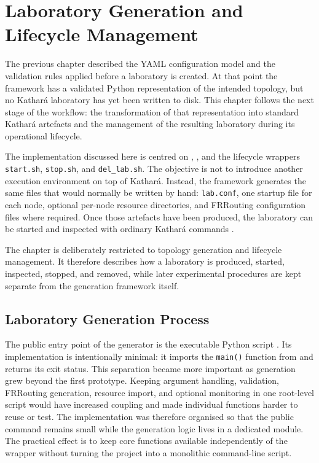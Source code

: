 \chapter{Laboratory Generation and Lifecycle Management}
\label{chap:laboratory-generation}

The previous chapter described the YAML configuration model and the validation
rules applied before a laboratory is created. At that point the framework has a
validated Python representation of the intended topology, but no Kathar\'a
laboratory has yet been written to disk. This chapter follows the next stage of
the workflow: the transformation of that representation into standard Kathar\'a
artefacts and the management of the resulting laboratory during its operational
lifecycle.

The implementation discussed here is centred on ,
, and the lifecycle wrappers
\texttt{start.sh}, \texttt{stop.sh}, and \texttt{del\_lab.sh}. The objective is
not to introduce another execution environment on top of Kathar\'a. Instead,
the framework generates the same files that would normally be written by hand:
\texttt{lab.conf}, one startup file for each node, optional per-node resource
directories, and FRRouting configuration files where required. Once those
artefacts have been produced, the laboratory can be started and inspected with
ordinary Kathar\'a commands \cite{kathara_manpage}.

The chapter is deliberately restricted to topology generation and lifecycle
management. It therefore describes how a laboratory is produced, started,
inspected, stopped, and removed, while later experimental procedures are kept
separate from the generation framework itself.

\section{Laboratory Generation Process}
\label{sec:laboratory-generation-process}

The public entry point of the generator is the executable Python script
. Its implementation is intentionally minimal: it
imports the \texttt{main()} function from  and
returns its exit status. This separation became more important as generation
grew beyond the first prototype. Keeping argument handling, validation,
FRRouting generation, resource import, and optional monitoring in one root-level
script would have increased coupling and made individual functions harder to
reuse or test. The implementation was therefore organised so that the public
command remains small while the generation logic lives in a dedicated module.
The practical effect is to keep core functions available independently of the
wrapper without turning the project into a monolithic command-line script.


